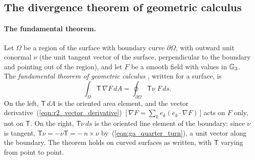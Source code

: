 \subsection{The divergence theorem of geometric calculus}

\paragraph{The fundamental theorem.} Let $\Omega$ be a region of the surface with boundary curve $\partial\Omega$, with outward unit conormal $\nu$ (the unit tangent vector of the surface, perpendicular to the boundary and pointing out of the region), and let $F$ be a smooth field with values in $\mathbb{G}_3$. The \emph{fundamental theorem of geometric calculus} \cite{HestenesSobczyk1984, Doran2003}, written for a surface, is
\begin{equation}
\label{eqn:r2_ftgc}
\int_\Omega \mathsf T\, \nabla F\, dA = \oint_{\partial\Omega} \mathsf T\nu\; F\, ds .
\end{equation}
On the left, $\mathsf T\, dA$ is the oriented area element, and the vector derivative~(\ref{eqn:r2_vector_derivative})~[\,$\nabla F = \sum_k e_k(e_k\cdot\nabla F)$\,] acts on $F$ only, not on $\mathsf T$. On the right, $\mathsf T\nu\, ds$ is the oriented line element of the boundary: since $\nu$ is tangent, $\mathsf T\nu = -\nu\mathsf T = -\,n\times\nu$ by~(\ref{eqn:ga_quarter_turn}), a unit vector along the boundary. The theorem holds on curved surfaces as written, with $\mathsf T$ varying from point to point.

